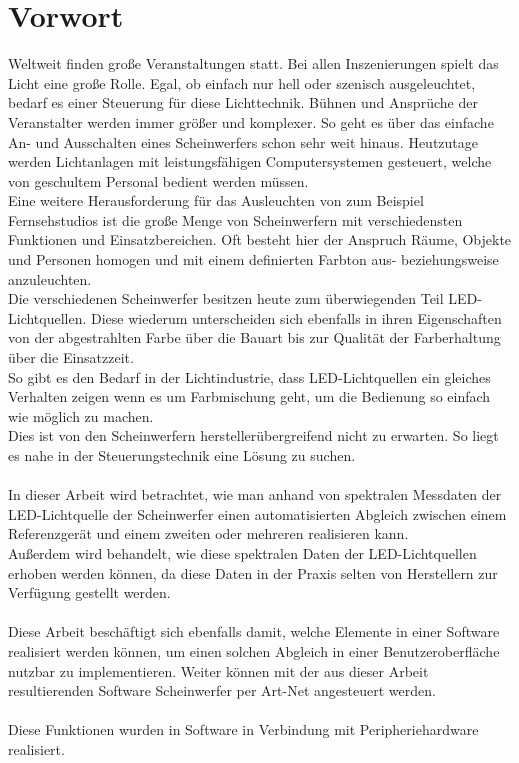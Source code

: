 \documentclass[11pt]{scrartcl}
\begin{document}
\section*{Vorwort}
Weltweit finden große Veranstaltungen statt. Bei allen Inszenierungen spielt das Licht eine
große Rolle. Egal, ob einfach nur hell oder szenisch ausgeleuchtet, bedarf es einer Steuerung
für diese Lichttechnik. Bühnen und Ansprüche der Veranstalter werden immer größer und komplexer.
So geht es über das einfache An- und Ausschalten eines Scheinwerfers schon sehr weit hinaus.
Heutzutage werden Lichtanlagen mit leistungsfähigen Computersystemen gesteuert, welche von
geschultem Personal bedient werden müssen.\\
Eine weitere Herausforderung für das Ausleuchten von zum Beispiel Fernsehstudios ist die große
Menge von Scheinwerfern mit verschiedensten Funktionen und Einsatzbereichen. Oft besteht hier
der Anspruch Räume, Objekte und Personen homogen und mit einem definierten Farbton aus-
beziehungsweise anzuleuchten.\\
Die verschiedenen Scheinwerfer besitzen heute zum überwiegenden Teil LED-Lichtquellen. Diese
wiederum unterscheiden sich ebenfalls in ihren Eigenschaften von der abgestrahlten Farbe über
die Bauart bis zur Qualität der Farberhaltung über die Einsatzzeit.\\
So gibt es den Bedarf in der Lichtindustrie, dass LED-Lichtquellen ein gleiches Verhalten zeigen
wenn es um Farbmischung geht, um die Bedienung so einfach wie möglich zu machen.\\
Dies ist von den Scheinwerfern herstellerübergreifend nicht zu erwarten. So liegt es nahe in der
Steuerungstechnik eine Lösung zu suchen.\\
\\
In dieser Arbeit wird betrachtet, wie man anhand von spektralen Messdaten der LED-Lichtquelle der
Scheinwerfer einen automatisierten Abgleich zwischen einem Referenzgerät und einem zweiten oder
mehreren realisieren kann.\\
Außerdem wird behandelt, wie diese spektralen Daten der LED-Lichtquellen erhoben werden können, da
diese Daten in der Praxis selten von Herstellern zur Verfügung gestellt werden.\\
\\
Diese Arbeit beschäftigt sich ebenfalls damit, welche Elemente in einer Software realisiert werden
können, um einen solchen Abgleich in einer Benutzeroberfläche nutzbar zu implementieren. Weiter
können mit der aus dieser Arbeit resultierenden Software Scheinwerfer per Art-Net angesteuert werden.\\
\\
Diese Funktionen wurden in Software in Verbindung mit Peripheriehardware realisiert.
\clearpage
\end{document}
